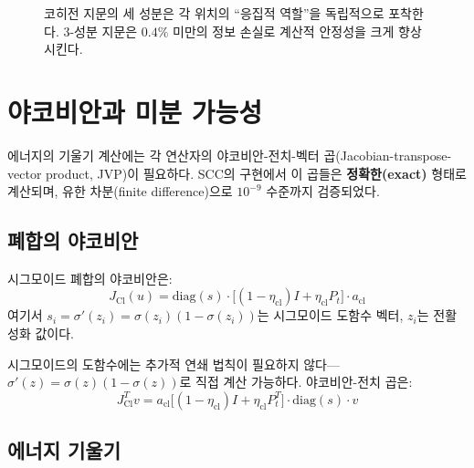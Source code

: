 \begin{figure}[t]
\centering
\caption{코히전 지문의 세 성분은 각 위치의 ``응집적 역할''을 독립적으로 포착한다. 3-성분 지문은 $0.4\%$ 미만의 정보 손실로 계산적 안정성을 크게 향상시킨다.}
\label{fig:fingerprint-components}
\end{figure}


\section{야코비안과 미분 가능성}
\label{sec:jacobians}

에너지의 기울기 계산에는 각 연산자의 야코비안-전치-벡터 곱(Jacobian-transpose-vector product, JVP)이 필요하다. SCC의 구현에서 이 곱들은 \textbf{정확한(exact)} 형태로 계산되며, 유한 차분(finite difference)으로 $10^{-9}$ 수준까지 검증되었다.

\subsection{폐합의 야코비안}

시그모이드 폐합의 야코비안은:
\begin{equation}
    J_{\mathrm{Cl}}(u) = \mathrm{diag}(s) \cdot \big[ (1-\eta_{\mathrm{cl}}) I + \eta_{\mathrm{cl}} P_t \big] \cdot a_{\mathrm{cl}}
\end{equation}
여기서 $s_i = \sigma'(z_i) = \sigma(z_i)(1-\sigma(z_i))$는 시그모이드 도함수 벡터, $z_i$는 전활성화 값이다.

시그모이드의 도함수에는 추가적 연쇄 법칙이 필요하지 않다---$\sigma'(z) = \sigma(z)(1-\sigma(z))$로 직접 계산 가능하다. 야코비안-전치 곱은:
\begin{equation}
    J_{\mathrm{Cl}}^T v = a_{\mathrm{cl}} \big[ (1-\eta_{\mathrm{cl}}) I + \eta_{\mathrm{cl}} P_t^T \big] \cdot \mathrm{diag}(s) \cdot v
\end{equation}

\subsection{에너지 기울기}

